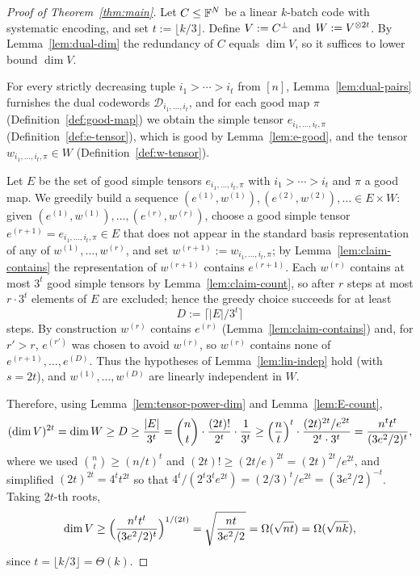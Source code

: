 \begin{proof}[Proof of Theorem~\ref{thm:main}]
  Let $C \le \mathbb{F}^N$ be a linear $k$-batch code with systematic encoding, and set
  $t := \lfloor k/3 \rfloor$. Define $V := C^{\perp}$ and
  $W := V^{\otimes 2t}$. By Lemma~\ref{lem:dual-dim} the redundancy of $C$ equals
  $\dim V$, so it suffices to lower bound $\dim V$.

  For every strictly decreasing tuple $i_1 > \cdots > i_t$ from $[n]$,
  Lemma~\ref{lem:dual-pairs} furnishes the dual codewords
  $\mathcal{D}_{i_1, \dots, i_t}$, and for each good map $\pi$
  (Definition~\ref{def:good-map}) we obtain the simple tensor
  $e_{i_1, \dots, i_t, \pi}$ (Definition~\ref{def:e-tensor}), which is good by
  Lemma~\ref{lem:e-good}, and the tensor $w_{i_1, \dots, i_t, \pi} \in W$
  (Definition~\ref{def:w-tensor}).

  Let $E$ be the set of good simple tensors $e_{i_1, \dots, i_t, \pi}$ with
  $i_1 > \cdots > i_t$ and $\pi$ a good map. We greedily build a sequence
  $(e^{(1)}, w^{(1)}), (e^{(2)}, w^{(2)}), \dots \in E \times W$: given
  $(e^{(1)}, w^{(1)}), \dots, (e^{(r)}, w^{(r)})$, choose a good simple tensor
  $e^{(r+1)} = e_{i_1, \dots, i_t, \pi} \in E$ that does not appear in the
  standard basis representation of any of $w^{(1)}, \dots, w^{(r)}$, and set
  $w^{(r+1)} := w_{i_1, \dots, i_t, \pi}$; by Lemma~\ref{lem:claim-contains} the
  representation of $w^{(r+1)}$ contains $e^{(r+1)}$. Each $w^{(r)}$ contains at
  most $3^t$ good simple tensors by Lemma~\ref{lem:claim-count}, so after $r$
  steps at most $r \cdot 3^t$ elements of $E$ are excluded; hence the greedy
  choice succeeds for at least
  \[
    D := \lceil |E| / 3^t \rceil
  \]
  steps. By construction $w^{(r)}$ contains $e^{(r)}$ (Lemma~\ref{lem:claim-contains})
  and, for $r' > r$, $e^{(r')}$ was chosen to avoid $w^{(r)}$, so $w^{(r)}$
  contains none of $e^{(r+1)}, \dots, e^{(D)}$. Thus the hypotheses of
  Lemma~\ref{lem:lin-indep} hold (with $s = 2t$), and $w^{(1)}, \dots, w^{(D)}$
  are linearly independent in $W$.

  Therefore, using Lemma~\ref{lem:tensor-power-dim} and Lemma~\ref{lem:E-count},
  \[
    (\dim V)^{2t} = \dim W \ge D \ge \frac{|E|}{3^t}
      = \binom{n}{t} \cdot \frac{(2t)!}{2^t} \cdot \frac{1}{3^t}
      \ge \Bigl(\frac{n}{t}\Bigr)^t \cdot \frac{(2t)^{2t}/e^{2t}}{2^t \cdot 3^t}
      = \frac{n^t t^t}{(3e^2/2)^t},
  \]
  where we used $\binom{n}{t} \ge (n/t)^t$ and
  $(2t)! \ge (2t/e)^{2t} = (2t)^{2t}/e^{2t}$, and simplified
  $(2t)^{2t} = 4^t t^{2t}$ so that
  $4^t/(2^t 3^t e^{2t}) = (2/3)^t/e^{2t} = (3e^2/2)^{-t}$. Taking $2t$-th roots,
  \[
    \dim V \ge \Bigl(\frac{n^t t^t}{(3e^2/2)^t}\Bigr)^{1/(2t)}
      = \sqrt{\frac{n t}{3e^2/2}} = \Omega(\sqrt{nt}) = \Omega(\sqrt{nk}),
  \]
  since $t = \lfloor k/3 \rfloor = \Theta(k)$.


\end{proof}
